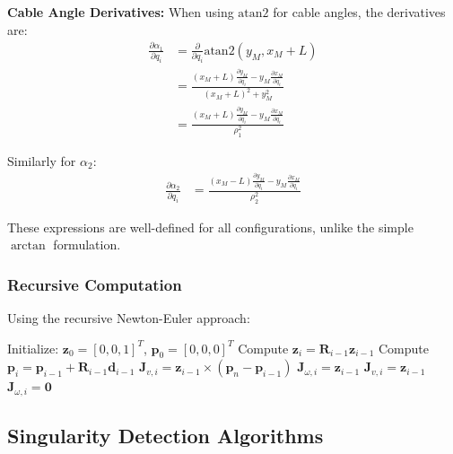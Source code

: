 \documentclass[11pt,a4paper]{article}
\begin{document}
\textbf{Cable Angle Derivatives:}
When using $\text{atan2}$ for cable angles, the derivatives are:
\begin{align}
\frac{\partial \alpha_1}{\partial q_i} &= \frac{\partial}{\partial q_i}\text{atan2}(y_M, x_M + L) \\
&= \frac{(x_M + L)\frac{\partial y_M}{\partial q_i} - y_M\frac{\partial x_M}{\partial q_i}}{(x_M + L)^2 + y_M^2} \\
&= \frac{(x_M + L)\frac{\partial y_M}{\partial q_i} - y_M\frac{\partial x_M}{\partial q_i}}{\rho_1^2}
\end{align}

Similarly for $\alpha_2$:
\begin{align}
\frac{\partial \alpha_2}{\partial q_i} &= \frac{(x_M - L)\frac{\partial y_M}{\partial q_i} - y_M\frac{\partial x_M}{\partial q_i}}{\rho_2^2}
\end{align}

These expressions are well-defined for all configurations, unlike the simple $\arctan$ formulation.

\subsubsection{Recursive Computation}
Using the recursive Newton-Euler approach:
\begin{algorithm}
\caption{Recursive Jacobian Computation}
\begin{algorithmic}[1]
\STATE Initialize: $\bm{z}_0 = [0, 0, 1]^T$, $\bm{p}_0 = [0, 0, 0]^T$
    \STATE Compute $\bm{z}_i = \bm{R}_{i-1} \bm{z}_{i-1}$
    \STATE Compute $\bm{p}_i = \bm{p}_{i-1} + \bm{R}_{i-1} \bm{d}_{i-1}$
        \STATE $\bm{J}_{v,i} = \bm{z}_{i-1} \times (\bm{p}_n - \bm{p}_{i-1})$
        \STATE $\bm{J}_{\omega,i} = \bm{z}_{i-1}$
    \ELSE
        \STATE $\bm{J}_{v,i} = \bm{z}_{i-1}$
        \STATE $\bm{J}_{\omega,i} = \bm{0}$
    \ENDIF
\ENDFOR
\end{algorithmic}
\end{algorithm}

\subsection{Singularity Detection Algorithms}
\end{document}
